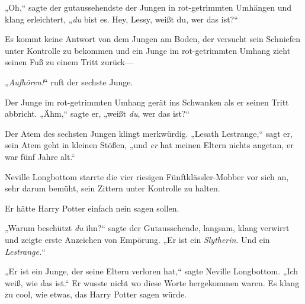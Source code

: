 „Oh,“ sagte der gutaussehendste der Jungen in rot-getrimmten Umhängen und klang erleichtert, „\emph{du} bist es. Hey, Lessy, weißt du, wer das ist?“

Es kommt keine Antwort von dem Jungen am Boden, der versucht sein Schniefen unter Kontrolle zu bekommen und ein Junge im rot-getrimmten Umhang zieht seinen Fuß zu einem Tritt zurück—

„\emph{Aufhören!}“ ruft der sechste Junge.

Der Junge im rot-getrimmten Umhang gerät ins Schwanken als er seinen Tritt abbricht. „Ähm,“ sagte er, „weißt \emph{du}, wer das ist?“

Der Atem des sechsten Jungen klingt merkwürdig. „Lesath Lestrange,“ sagt er, sein Atem geht in kleinen Stößen, „und \emph{er} hat meinen Eltern nichts angetan, er war fünf Jahre alt.“

\later

Neville Longbottom starrte die vier riesigen Fünftklässler-Mobber vor sich an, sehr darum bemüht, sein Zittern unter Kontrolle zu halten.

Er hätte Harry Potter einfach nein sagen sollen.

„Warum beschützt \emph{du} ihn?“ sagte der Gutaussehende, langsam, klang verwirrt und zeigte erste Anzeichen von Empörung. „Er ist ein \emph{Slytherin}. Und ein \emph{Lestrange.}“

„Er ist ein Junge, der seine Eltern verloren hat,“ sagte Neville Longbottom. „Ich weiß, wie das ist.“ Er wusste nicht wo diese Worte hergekommen waren. Es klang zu cool, wie etwas, das Harry Potter sagen würde.

